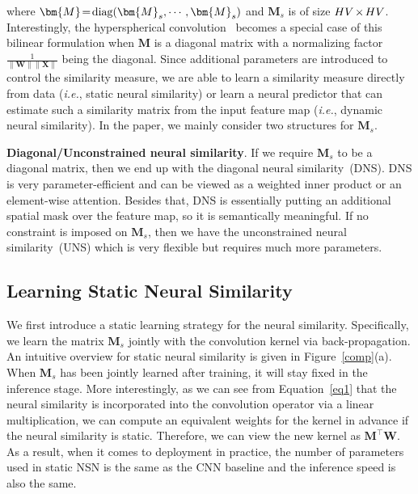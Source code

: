 where $\thickmuskip=2mu \medmuskip=2mu \bm{M}=\textnormal{diag}(\bm{M}_s,\cdots,\bm{M}_s)$ and $\bm{M}_s$ is of size $\thickmuskip=2mu \medmuskip=2mu HV\times HV$. Interestingly, the hyperspherical convolution~\cite{liu2017hyper} becomes a special case of this bilinear formulation when $\bm{M}$ is a diagonal matrix with a normalizing factor $\frac{1}{\|\bm{W}\|\|\bm{X}\|}$ being the diagonal. Since additional parameters are introduced to control the similarity measure, we are able to learn a similarity measure directly from data (\emph{i.e.}, static neural similarity) or learn a neural predictor that can estimate such a similarity matrix from the input feature map (\emph{i.e.}, dynamic neural similarity). In the paper, we mainly consider two structures for $\bm{M}_s$.
\par
\textbf{Diagonal/Unconstrained neural similarity}. If we require $\bm{M}_s$ to be a diagonal matrix, then we end up with the diagonal neural similarity~(DNS). DNS is very parameter-efficient and can be viewed as a weighted inner product or an element-wise attention. Besides that, DNS is essentially putting an additional spatial mask over the feature map, so it is semantically meaningful. If no constraint is imposed on $\bm{M}_s$, then we have the unconstrained neural similarity~(UNS) which is very flexible but requires much more parameters.

\subsection{Learning Static Neural Similarity}

We first introduce a static learning strategy for the neural similarity. Specifically, we learn the matrix $\bm{M}_s$ jointly with the convolution kernel via back-propagation. An intuitive overview for static neural similarity is given in Figure~\ref{comp}(a). When $\bm{M}_s$ has been jointly learned after training, it will stay fixed in the inference stage. More interestingly, as we can see from Equation~\eqref{eq1} that the neural similarity is incorporated into the convolution operator via a linear multiplication, we can compute an equivalent weights for the kernel in advance if the neural similarity is static. Therefore, we can view the new kernel as $\bm{M}^\top\bm{W}$. As a result, when it comes to deployment in practice, the number of parameters used in static NSN is the same as the CNN baseline and the inference speed is also the same.
\par

